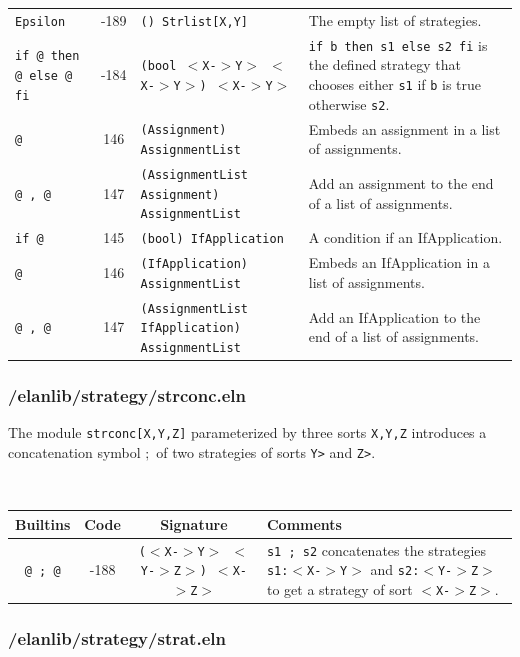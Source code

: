 \begin{tabular}{|p{2cm}|c|p{5cm}|p{6cm}|}
{\tt Epsilon}           & -189 & {\tt () Strlist[X,Y]} & The empty list of strategies.\\
{\tt if @ then @ else @ fi}     & -184 & {\tt (bool $<$X-$>$Y$>$ $<$X-$>$Y$>$) $<$X-$>$Y$>$} & {\tt if b then s1 else s2 fi} is the defined strategy that chooses either {\tt s1} if {\tt b} is true otherwise {\tt s2}.\\
{\tt @}                 & 146 & {\tt (Assignment) AssignmentList} & Embeds an assignment in a list of assignments.\\
{\tt @ , @}             & 147 & {\tt (AssignmentList Assignment) AssignmentList} & Add an assignment to the end of a list of assignments.\\
{\tt if @}              & 145 & {\tt (bool) IfApplication} & A condition if an IfApplication.\\
{\tt @}                 & 146 & {\tt (IfApplication) AssignmentList} & Embeds an IfApplication in a list of assignments.\\
{\tt @ , @}             & 147 & {\tt (AssignmentList IfApplication) AssignmentList} & Add an  IfApplication to the end of a list of assignments.\\
\hline
\end{tabular}


\subsubsection{/elanlib/strategy/strconc.eln}


The module {\tt strconc[X,Y,Z]} parameterized by three sorts
{\tt X,Y,Z} introduces a concatenation symbol $;$ of
two strategies of sorts {\tt <X->Y>} and {\tt <Y->Z>}.

~\\
\begin{tabular}{|c|c|c|p{6cm}|}
\hline
{\bf Builtins} & {\bf Code} & {\bf Signature} & {\bf Comments} \\
\hline
\hline
{\tt @ ; @}     & -188 & {\tt ($<$X-$>$Y$>$ $<$Y-$>$Z$>$) $<$X-$>$Z$>$} & {\tt s1 ; s2} concatenates the strategies {\tt s1:$<$X-$>$Y$>$} and {\tt s2:$<$Y-$>$Z$>$} to get a strategy of sort {\tt $<$X-$>$Z$>$}.\\
\hline
\end{tabular}


\subsubsection{/elanlib/strategy/strat.eln}

